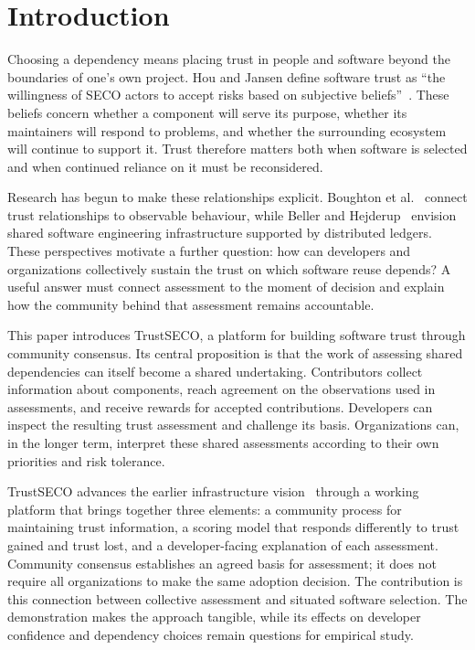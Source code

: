 \documentclass[10pt,conference]{IEEEtran}
\begin{document}
\section{Introduction}
Choosing a dependency means placing trust in people and software beyond the boundaries of one's own project. Hou and Jansen define software trust as ``the willingness of SECO actors to accept risks based on subjective beliefs''~\cite[Sec.~4.1.6]{hou2023systematic}. These beliefs concern whether a component will serve its purpose, whether its maintainers will respond to problems, and whether the surrounding ecosystem will continue to support it. Trust therefore matters both when software is selected and when continued reliance on it must be reconsidered.

Research has begun to make these relationships explicit. Boughton et al.~\cite{boughton2024decomposing} connect trust relationships to observable behaviour, while Beller and Hejderup~\cite{beller2019blockchain} envision shared software engineering infrastructure supported by distributed ledgers. These perspectives motivate a further question: how can developers and organizations collectively sustain the trust on which software reuse depends? A useful answer must connect assessment to the moment of decision and explain how the community behind that assessment remains accountable.

This paper introduces TrustSECO, a platform for building software trust through community consensus. Its central proposition is that the work of assessing shared dependencies can itself become a shared undertaking. Contributors collect information about components, reach agreement on the observations used in assessments, and receive rewards for accepted contributions. Developers can inspect the resulting trust assessment and challenge its basis. Organizations can, in the longer term, interpret these shared assessments according to their own priorities and risk tolerance.

TrustSECO advances the earlier infrastructure vision~\cite{hou2021trustseco} through a working platform that brings together three elements: a community process for maintaining trust information, a scoring model that responds differently to trust gained and trust lost, and a developer-facing explanation of each assessment. Community consensus establishes an agreed basis for assessment; it does not require all organizations to make the same adoption decision. The contribution is this connection between collective assessment and situated software selection. The demonstration makes the approach tangible, while its effects on developer confidence and dependency choices remain questions for empirical study.
\end{document}
